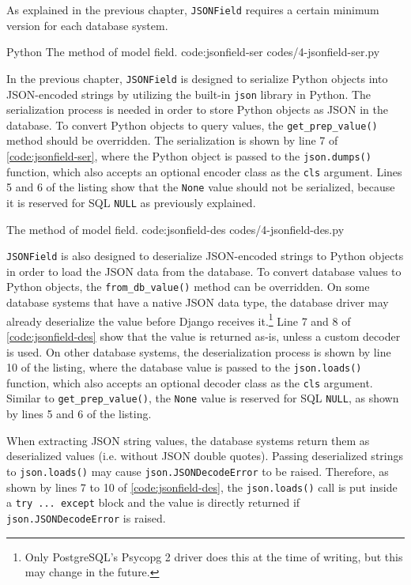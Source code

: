 As explained in the previous chapter, \verb|JSONField| requires a certain
minimum version for each database system.

\listing
{Python}
{The  method of  model field.}
{code:jsonfield-ser}
{codes/4-jsonfield-ser.py}

In the previous chapter, \verb|JSONField| is designed to serialize Python
objects into JSON-encoded strings by utilizing the built-in \verb|json| library
in Python. The serialization process is needed in order to store Python objects
as JSON in the database. To convert Python objects to query values, the
\verb|get_prep_value()| method should be overridden. The serialization is shown
by line 7 of \autoref{code:jsonfield-ser}, where the Python object is passed
to the \verb|json.dumps()| function, which also accepts an optional encoder
class as the \verb|cls| argument. Lines 5 and 6 of the listing show that the
\verb|None| value should not be serialized, because it is reserved for SQL
\verb|NULL| as previously explained.

{The  method of  model field.}
{code:jsonfield-des}
{codes/4-jsonfield-des.py}

\verb|JSONField| is also designed to deserialize JSON-encoded strings to Python
objects in order to load the JSON data from the database. To convert database
values to Python objects, the \verb|from_db_value()| method can be overridden.
On some database systems that have a native JSON data type, the database driver
may already deserialize the value before Django receives it.\footnote{Only
PostgreSQL's Psycopg 2 driver does this at the time of writing, but this may
change in the future.} Line 7 and 8 of \autoref{code:jsonfield-des} show that
the value is returned as-is, unless a custom decoder is used. On other database
systems, the deserialization process is shown by line 10 of the listing, where
the database value is passed to the \verb|json.loads()| function, which also
accepts an optional decoder class as the \verb|cls| argument. Similar to
\verb|get_prep_value()|, the \verb|None| value is reserved for SQL \verb|NULL|,
as shown by lines 5 and 6 of the listing.

When extracting JSON string values, the database systems return them as
deserialized values (i.e. without JSON double quotes). Passing deserialized
strings to \verb|json.loads()| may cause \verb|json.JSONDecodeError| to be
raised. Therefore, as shown by lines 7 to 10 of \autoref{code:jsonfield-des},
the \verb|json.loads()| call is put inside a \verb|try ... except| block and
the value is directly returned if \verb|json.JSONDecodeError| is raised.

